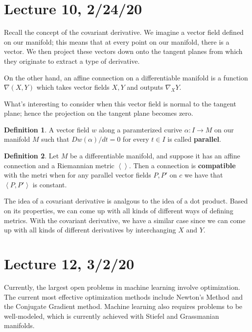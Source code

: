 \documentclass[12pt,letterpaper,boxed]{maths_v5}
\theoremstyle{definition}
\newtheorem{definition}{Definition}[section]
\begin{document}
\section*{Lecture 10, 2/24/20}
Recall the concept of the covariant derivative. We imagine a vector field defined 
on our manifold; this means that at every point on our manifold, there 
is a vector. We then project these vectors down onto the tangent planes from which they 
originate to extract a type of derivative. 

On the other hand, an affine connection on a differentiable manifold is a 
function $\nabla(X,Y)$ which takes vector fields $X,Y$ and outputs $\nabla_XY$. 

What's interesting to consider when this vector field is normal to the tangent plane; 
hence the projection on the tangent plane becomes zero. 

\begin{definition}
    A vector field $w$ along a paramterized curive $\alpha: I \to M$ on our manifold 
    $M$ such that 
    $Dw(\alpha)/dt = 0$ for every  $t \in I$ is called \textbf{parallel}.  
\end{definition}

\begin{definition}
    Let $M$ be a differentiable manifold, and suppose it has an affine connection 
    and a Riemannian metric $\left< \right>$. Then a connection is \textbf{compatible}
    with the metri when for any parallel vector fields $P, P'$ on $c$ we have that  
    $\left< P,P' \right>$ is constant.
\end{definition}

The idea of a covariant derivative is analgous to the idea of a dot product. Based on its properties, 
we can come up with all kinds of different ways of defining metrics. With the covariant derivative, we have a  
similar case since we can come up with all kinds of different derivatives by interchanging  $X$ and $Y$. 

\section*{Lecture 12, 3/2/20}
Currently, the largest open problems in machine learning involve optimization. 
The current most effective optimization methods include Newton's Method and the 
Conjugate Gradient method. Machine learning also requires problems to be well-modeled, 
which is currently achieved with Stiefel and Grassmanian manifolds. 
\end{document}
